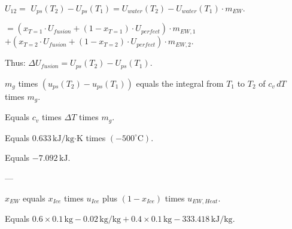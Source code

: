 \( U_{12} = \)  
\( U_{ps}(T_2) - U_{ps}(T_1) = U_{water}(T_2) - U_{water}(T_1) \cdot m_{EW} \).  

\( = (x_{T=1} \cdot U_{fusion} + (1 - x_{T=1}) \cdot U_{perfect}) \cdot m_{EW,1} \)  
\( + (x_{T=2} \cdot U_{fusion} + (1 - x_{T=2}) \cdot U_{perfect}) \cdot m_{EW,2} \).  

Thus:  
\( \Delta U_{fusion} = U_{ps}(T_2) - U_{ps}(T_1) \).

\( m_g \) times \( (u_{ps}(T_2) - u_{ps}(T_1)) \) equals the integral from \( T_1 \) to \( T_2 \) of \( c_v \, dT \) times \( m_g \).  

Equals \( c_v \) times \( \Delta T \) times \( m_g \).  

Equals \( 0.633 \, \text{kJ/kg·K} \) times \( (-500^\circ \text{C}) \).  

Equals \( -7.092 \, \text{kJ} \).  

---

\( x_{EW} \) equals \( x_{Ice} \) times \( u_{Ice} \) plus \( (1 - x_{Ice}) \) times \( u_{EW,Heat} \).  

Equals \( 0.6 \times 0.1 \, \text{kg} - 0.02 \, \text{kg/kg} + 0.4 \times 0.1 \, \text{kg} - 333.418 \, \text{kJ/kg} \).